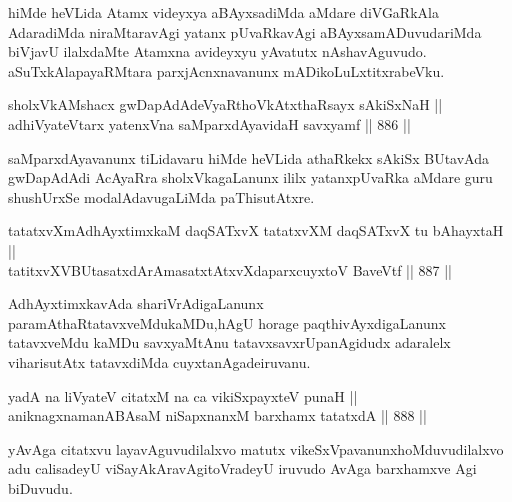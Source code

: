 \begin{artha}
hiMde heVLida Atamx videyxya aBAyxsadiMda aMdare diVGaRkAla AdaradiMda niraMtaravAgi yatanx pUvaRkavAgi aBAyxsamADuvudariMda biVjavU ilalxdaMte Atamxna avideyxyu yAvatutx nAshavAguvudo. aSuTxkAlapayaRMtara parxjAcnxnavanunx mADikoLuLxtitxrabeVku.
\end{artha}

\begin{shl}
sholxVkAMshacx gwDapAdAdeVyaRthoVkAtxthaRsayx sAkiSxNaH || \\
adhiVyateV\s tarx yatenxVna saMparxdAyavidaH savxyamf \hfill || 886 ||  
\end{shl}

\begin{artha}
saMparxdAyavanunx tiLidavaru hiMde heVLida athaRkekx sAkiSx BUtavAda gwDapAdAdi AcAyaRra sholxVkagaLanunx ililx yatanxpUvaRka aMdare guru shushUrxSe modalAdavugaLiMda paThisutAtxre.
\end{artha}



\begin{shl}
tatatxvXmAdhAyxtimxkaM daqSATxvX tatatxvXM daqSATxvX tu bAhayxtaH ||  \\
tatitxvXVBUtasatxdArAmasatxtAtxvXdaparxcuyxtoV BaveVtf \hfill || 887 ||  
\end{shl}

\begin{artha}
AdhAyxtimxkavAda shariVrAdigaLanunx paramAthaRtatavxveMdukaMDu,\break hAgU horage paqthivAyxdigaLanunx tatavxveMdu kaMDu savxyaMtAnu tatavxsavxrUpanAgidudx adaralelx viharisutAtx tatavxdiMda cuyxtanAgade\break iruvanu.
\end{artha}


\begin{shl}
yadA na liVyateV citatxM na ca vikiSxpayxteV punaH || \\
aniknagxnamanABAsaM niSapxnanxM barxhamx tatatxdA \hfill || 888 ||  
\end{shl}

\begin{artha}
yAvAga citatxvu layavAguvudilalxvo matutx vikeSxVpavanunx\break hoMduvudilalxvo adu calisadeyU viSayAkAravAgi\break toVradeyU iruvudo AvAga barxhamxve Agi biDuvudu.
\end{artha}


